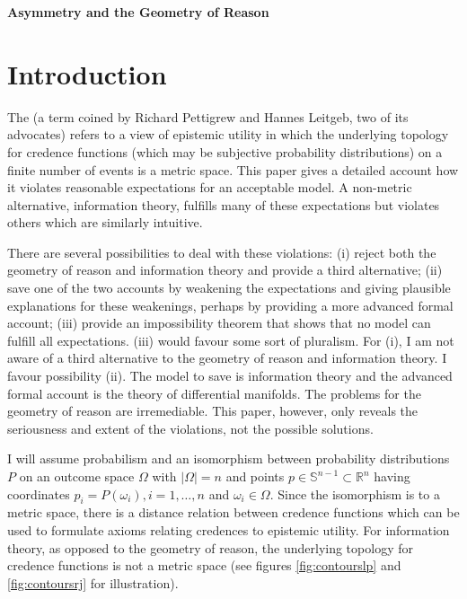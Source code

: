 \documentclass[11pt]{article}
\begin{document}



\textbf{\Large Asymmetry and the Geometry of Reason}

\section{Introduction}
\label{intr}

The  (a term coined by Richard Pettigrew and
Hannes Leitgeb, two of its advocates) refers to a view of epistemic
utility in which the underlying topology for credence functions (which
may be subjective probability distributions) on a finite number of
events is a metric space. This paper gives a detailed account how it
violates reasonable expectations for an acceptable model. A non-metric
alternative, information theory, fulfills many of these expectations
but violates others which are similarly intuitive.

There are several possibilities to deal with these violations: (i)
reject both the geometry of reason and information theory and provide
a third alternative; (ii) save one of the two accounts by weakening
the expectations and giving plausible explanations for these
weakenings, perhaps by providing a more advanced formal account; (iii)
provide an impossibility theorem that shows that no model can fulfill
all expectations. (iii) would favour some sort of pluralism. For (i),
I am not aware of a third alternative to the geometry of reason and
information theory. I favour possibility (ii). The model to save is
information theory and the advanced formal account is the theory of
differential manifolds. The problems for the geometry of reason are
irremediable. This paper, however, only reveals the seriousness and
extent of the violations, not the possible solutions.

I will assume probabilism and an isomorphism between probability
distributions $P$ on an outcome space $\Omega$ with $|\Omega|=n$ and
points $p\in\mathbb{S}^{n-1}\subset\mathbb{R}^{n}$ having coordinates
$p_{i}=P(\omega_{i}),i=1,\ldots,n$ and $\omega_{i}\in{}\Omega$. Since
the isomorphism is to a metric space, there is a distance relation
between credence functions which can be used to formulate axioms
relating credences to epistemic utility. For information theory, as
opposed to the geometry of reason, the underlying topology for
credence functions is not a metric space (see figures
\ref{fig:contourslp} and \ref{fig:contoursrj} for illustration).
\end{document}
